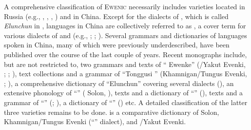 \documentclass[output=paper,colorlinks,citecolor=brown]{langscibook}
\begin{document}
A comprehensive classification of \textsc{Ewenic} necessarily includes varieties located in Russia (e.g., , , , ) and in China. Except for the dialects of , which is called \textit{Elunchun}  in ,  languages in China are collectively referred to as \textit{} , a cover term for various dialects of  and  (e.g., \citealt{Tsumagari1992}; \citealt{Janhunen1996}; ). Several grammars and dictionaries of  languages spoken in China, many of which were previously underdescribed, have been published over the course of the last couple of years. Recent monographs include, but are not restricted to, two grammars and texts of “ Ewenke” (/Yakut Evenki, \citealt{ChaokeSirenbatu2016}; \citealt{Hasibateer2016}; \citealt{WengChaoke2016}), text collections and a grammar of “Tonggusi ” (Khamnigan/Tungus Evenki, \citealt{ChaokeKajia2016}; \citealt{DuoChaoke2016}), a comprehensive dictionary of “Elunchun” covering several  dialects (\citealt{HanMeng2019}), an extensive phonology of “” ( Solon, \citealt{Wurigexiletu2018}), texts and a dictionary of “” (\citealt{ChaokeKalina2017}), texts and a grammar of “” (\citealt{Najia2017}; \citealt{ChaokeNajia2017}), a dictionary of “” (\citealt{ChaokeKajia2017}) etc. A detailed classification of the latter three varieties remains to be done. \citet{Chaoke2017} is a comparative dictionary of  Solon, Khamnigan/Tungus Evenki (“” dialect), and /Yakut Evenki.
\end{document}

